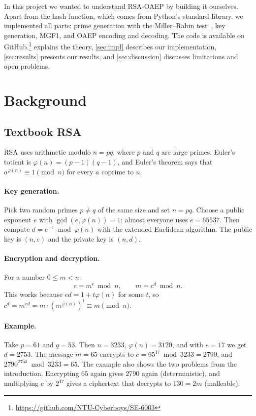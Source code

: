 \documentclass[runningheads]{llncs}
\begin{document}
In this project we wanted to understand RSA-OAEP by building it ourselves.
Apart from the hash function, which comes from Python's standard library, we
implemented all parts: prime generation with the Miller--Rabin
test~\cite{miller1976,rabin1980}, key generation, MGF1, and OAEP encoding and
decoding. The code is available on GitHub.\footnote{\url{https://github.com/NTU-Cyberboys/SE-6003}}
 explains the theory, \cref{sec:impl} describes our
implementation, \cref{sec:results} presents our results, and
\cref{sec:discussion} discusses limitations and open problems.

\section{Background}\label{sec:background}

\subsection{Textbook RSA}

RSA uses arithmetic modulo $n = pq$, where $p$ and $q$ are large primes.
Euler's totient is $\varphi(n) = (p-1)(q-1)$, and Euler's theorem says that
$a^{\varphi(n)} \equiv 1 \pmod n$ for every $a$ coprime to $n$.

\paragraph{Key generation.} Pick two random primes $p \neq q$ of the same
size and set $n = pq$. Choose a public exponent $e$ with
$\gcd(e,\varphi(n)) = 1$; almost everyone uses $e = 65537$. Then compute
$d = e^{-1} \bmod \varphi(n)$ with the extended Euclidean algorithm. The public
key is $(n,e)$ and the private key is $(n,d)$.

\paragraph{Encryption and decryption.} For a number $0 \le m < n$:
\begin{equation}
  c = m^e \bmod n, \qquad m = c^d \bmod n .
\end{equation}
This works because $ed = 1 + t\varphi(n)$ for some $t$, so
$c^d = m^{ed} = m \cdot (m^{\varphi(n)})^t \equiv m \pmod n$.

\paragraph{Example.} Take $p = 61$ and $q = 53$. Then $n = 3233$,
$\varphi(n) = 3120$, and with $e = 17$ we get $d = 2753$. The message
$m = 65$ encrypts to $c = 65^{17} \bmod 3233 = 2790$, and
$2790^{2753} \bmod 3233 = 65$. The example also shows the two problems from
the introduction. Encrypting $65$ again gives $2790$ again (deterministic),
and multiplying $c$ by $2^{17}$ gives a ciphertext that decrypts to
$130 = 2m$ (malleable).
\end{document}
